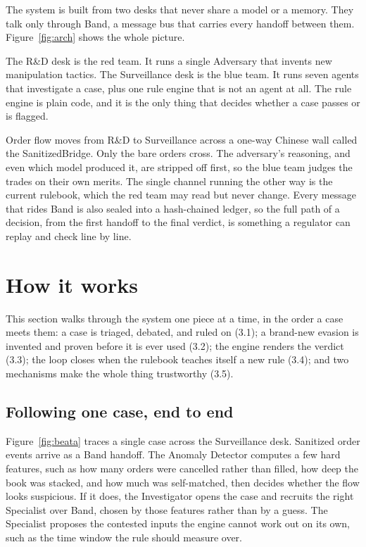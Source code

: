\documentclass[11pt,a4paper]{article}
\begin{document}
The system is built from two desks that never share a model or a memory. They talk only through Band, a message bus that carries every handoff between them. Figure~\ref{fig:arch} shows the whole picture.

The R\&D desk is the red team. It runs a single Adversary that invents new manipulation tactics. The Surveillance desk is the blue team. It runs seven agents that investigate a case, plus one rule engine that is not an agent at all. The rule engine is plain code, and it is the only thing that decides whether a case passes or is flagged.

Order flow moves from R\&D to Surveillance across a one-way Chinese wall called the SanitizedBridge. Only the bare orders cross. The adversary's reasoning, and even which model produced it, are stripped off first, so the blue team judges the trades on their own merits. The single channel running the other way is the current rulebook, which the red team may read but never change. Every message that rides Band is also sealed into a hash-chained ledger, so the full path of a decision, from the first handoff to the final verdict, is something a regulator can replay and check line by line.

\section{How it works}
This section walks through the system one piece at a time, in the order a case meets them: a case is triaged, debated, and ruled on (3.1); a brand-new evasion is invented and proven before it is ever used (3.2); the engine renders the verdict (3.3); the loop closes when the rulebook teaches itself a new rule (3.4); and two mechanisms make the whole thing trustworthy (3.5).

\subsection{Following one case, end to end}
Figure~\ref{fig:beata} traces a single case across the Surveillance desk. Sanitized order events arrive as a Band handoff. The Anomaly Detector computes a few hard features, such as how many orders were cancelled rather than filled, how deep the book was stacked, and how much was self-matched, then decides whether the flow looks suspicious. If it does, the Investigator opens the case and recruits the right Specialist over Band, chosen by those features rather than by a guess. The Specialist proposes the contested inputs the engine cannot work out on its own, such as the time window the rule should measure over.
\end{document}
